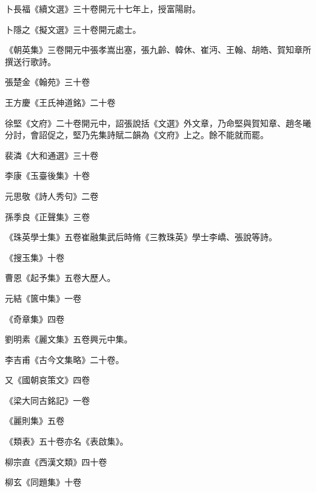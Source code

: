 \begin{pinyinscope}
 卜長福《續文選》三十卷開元十七年上，授富陽尉。



 卜隱之《擬文選》三十卷開元處士。



 《朝英集》三卷開元中張孝嵩出塞，張九齡、韓休、崔沔、王翰、胡皓、賀知章所撰送行歌詩。



 張楚金《翰苑》三十卷



 王方慶《王氏神道銘》二十卷



 徐堅《文府》二十卷開元中，詔張說括《文選》外文章，乃命堅與賀知章、趙冬曦分討，會詔促之，堅乃先集詩賦二韻為《文府》上之。餘不能就而罷。



 裴潾《大和通選》三十卷



 李康《玉臺後集》十卷



 元思敬《詩人秀句》二卷



 孫季良《正聲集》三卷



 《珠英學士集》五卷崔融集武后時脩《三教珠英》學士李嶠、張說等詩。



 《搜玉集》十卷



 曹恩《起予集》五卷大歷人。



 元結《篋中集》一卷



 《奇章集》四卷



 劉明素《麗文集》五卷興元中集。



 李吉甫《古今文集略》二十卷。



 又《國朝哀策文》四卷



 《梁大同古銘記》一卷



 《麗則集》五卷



 《類表》五十卷亦名《表啟集》。



 柳宗直《西漢文類》四十卷



 柳玄《同題集》十卷




\end{pinyinscope}

